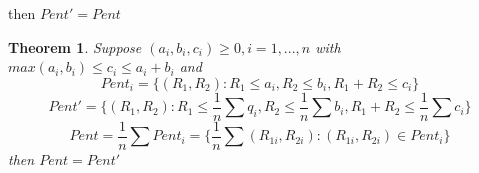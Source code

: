 \documentclass[twoside]{article}
\newtheorem{theorem}{Theorem}[section]
\theoremstyle{definition} %
\begin{document}
\begin{appendices}
then $Pent' = Pent$

\begin{theorem}
  Suppose $(a_i, b_i, c_i) \geq 0, i = 1 , ..., n$ with $max(a_i, b_i) \leq c_i \leq a_i + b_i$ and
  \[
    Pent_i = \{(R_1, R_2): R_1 \leq a_i, R_2 \leq b_i, R_1 + R_2 \leq c_i \}
  \]
  \[
    Pent' = \{(R_1, R_2): R_1 \leq \frac{1}{n} \sum q_i , R_2 \leq \frac{1}{n} \sum b_i, R_1 + R_2 \leq \frac{1}{n} \sum c_i \}
  \]
  \[
    Pent = \frac{1}{n} \sum Pent_i = \{\frac{1}{n} \sum (R_{1i}, R_{2i}) : (R_{1i}, R_{2i}) \in Pent_i \}
  \]
  then $Pent = Pent'$
\end{theorem}

\end{appendices}
\end{document}
